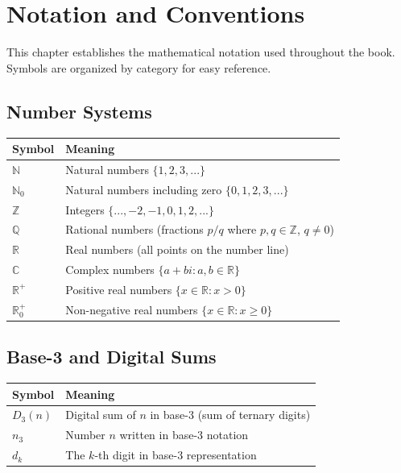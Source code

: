 \chapter*{Notation and Conventions}

This chapter establishes the mathematical notation used throughout the book. Symbols are organized by category for easy reference.

\section*{Number Systems}

\begin{center}
\begin{tabular}{ll}
\toprule
\textbf{Symbol} & \textbf{Meaning} \\
\midrule
$\mathbb{N}$ & Natural numbers $\{1, 2, 3, ...\}$ \\
$\mathbb{N}_0$ & Natural numbers including zero $\{0, 1, 2, 3, ...\}$ \\
$\mathbb{Z}$ & Integers $\{..., -2, -1, 0, 1, 2, ...\}$ \\
$\mathbb{Q}$ & Rational numbers (fractions $p/q$ where $p, q \in \mathbb{Z}$, $q \neq 0$) \\
$\mathbb{R}$ & Real numbers (all points on the number line) \\
$\mathbb{C}$ & Complex numbers $\{a + bi : a, b \in \mathbb{R}\}$ \\
$\mathbb{R}^+$ & Positive real numbers $\{x \in \mathbb{R} : x > 0\}$ \\
$\mathbb{R}^+_0$ & Non-negative real numbers $\{x \in \mathbb{R} : x \geq 0\}$ \\
\bottomrule
\end{tabular}
\end{center}

\section*{Base-3 and Digital Sums}

\begin{center}
\begin{tabular}{ll}
\toprule
\textbf{Symbol} & \textbf{Meaning} \\
\midrule
$D_3(n)$ & Digital sum of $n$ in base-3 (sum of ternary digits) \\
$n_3$ & Number $n$ written in base-3 notation \\
$d_k$ & The $k$-th digit in base-3 representation \\
\bottomrule
\end{tabular}
\end{center}


